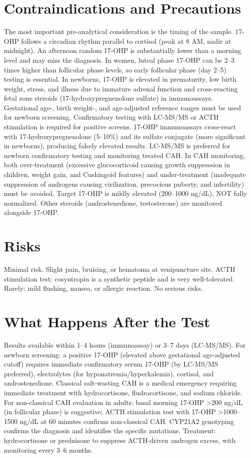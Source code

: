 \section*{Contraindications and Precautions}
The most important pre-analytical consideration is the timing of the sample. 17-OHP follows a circadian rhythm parallel to cortisol (peak at 8 AM, nadir at midnight). An afternoon random 17-OHP is substantially lower than a morning level and may miss the diagnosis. In women, luteal phase 17-OHP can be 2--3 times higher than follicular phase levels, so early follicular phase (day 2--5) testing is essential. In newborns, 17-OHP is elevated in prematurity, low birth weight, stress, and illness due to immature adrenal function and cross-reacting fetal zone steroids (17-hydroxypregnenolone sulfate) in immunoassays. Gestational age-, birth weight-, and age-adjusted reference ranges must be used for newborn screening. Confirmatory testing with LC-MS/MS or ACTH stimulation is required for positive screens. 17-OHP immunoassays cross-react with 17-hydroxypregnenolone (5--10\%) and its sulfate conjugate (more significant in newborns), producing falsely elevated results. LC-MS/MS is preferred for newborn confirmatory testing and monitoring treated CAH. In CAH monitoring, both over-treatment (excessive glucocorticoid causing growth suppression in children, weight gain, and Cushingoid features) and under-treatment (inadequate suppression of androgens causing virilization, precocious puberty, and infertility) must be avoided. Target 17-OHP is mildly elevated (200--1000 ng/dL), NOT fully normalized. Other steroids (androstenedione, testosterone) are monitored alongside 17-OHP.

\section*{Risks}
Minimal risk. Slight pain, bruising, or hematoma at venipuncture site. ACTH stimulation test: cosyntropin is a synthetic peptide and is very well-tolerated. Rarely: mild flushing, nausea, or allergic reaction. No serious risks.

\section*{What Happens After the Test}
Results available within 1--4 hours (immunoassay) or 3--7 days (LC-MS/MS). For newborn screening: a positive 17-OHP (elevated above gestational age-adjusted cutoff) requires immediate confirmatory serum 17-OHP (by LC-MS/MS preferred), electrolytes (for hyponatremia/hyperkalemia), cortisol, and androstenedione. Classical salt-wasting CAH is a medical emergency requiring immediate treatment with hydrocortisone, fludrocortisone, and sodium chloride. For non-classical CAH evaluation in adults: basal morning 17-OHP >200 ng/dL (in follicular phase) is suggestive; ACTH stimulation test with 17-OHP >1000--1500 ng/dL at 60 minutes confirms non-classical CAH. CYP21A2 genotyping confirms the diagnosis and identifies the specific mutations. Treatment: hydrocortisone or prednisone to suppress ACTH-driven androgen excess, with monitoring every 3--6 months.

